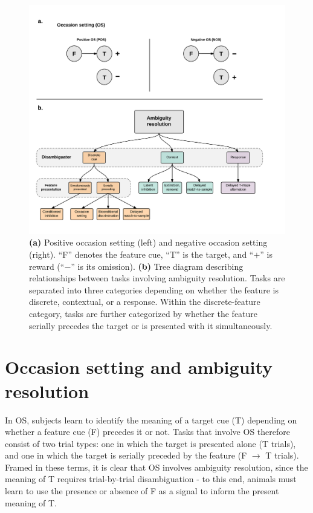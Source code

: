 \documentclass[11pt]{article}
\newcommand{\bsf}[1]{\textbf{#1}}
\begin{document}
\begin{figure}[h]
\centering
\includegraphics[width=\textwidth]{Figures/Fig1}
\caption{\bsf{(a)} Positive occasion setting (left) and negative occasion setting (right). ``F'' denotes the feature cue, ``T'' is the target, and ``$+$'' is reward (``$-$'' is its omission). \bsf{(b)} Tree diagram describing relationships between tasks involving ambiguity resolution. Tasks are separated into three categories depending on whether the feature is discrete, contextual, or a response. Within the discrete-feature category, tasks are further categorized by whether the feature serially precedes the target or is presented with it simultaneously.}
\label{fig:ambiguityTasks}
\end{figure}

\section*{Occasion setting and ambiguity resolution}

In OS, subjects learn to identify the meaning of a target cue (T) depending on 
whether a feature cue (F) precedes it or not. Tasks that involve OS therefore 
consist of two trial types: one in which the target is presented alone (T 
trials), and one in which the target is serially preceded by the feature (F $
\rightarrow$ T trials). Framed in these terms, it is clear that OS involves 
ambiguity resolution, since the meaning of T requires trial-by-trial 
disambiguation - to this end, animals must learn to use the presence or absence 
of F as a signal to inform the present meaning of T.
\end{document}
